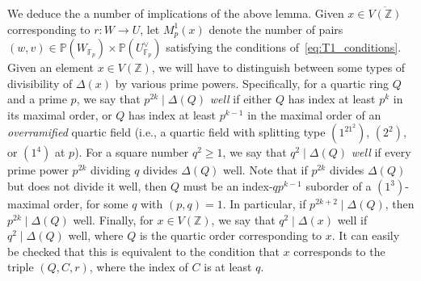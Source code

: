 \documentclass{article}
\def\Z{{\mathbb Z}}
\def\P{{\mathbb P}}
\def\F{{\mathbb F}}
\def\Z{{\mathbb Z}}
\def\P{{\mathbb P}}
\def\F{{\mathbb F}}
\def\ol{\overline}
\begin{document}
We deduce the a number of implications of the above lemma. Given $x\in \ol{V(\Z)}$ corresponding to $r:W\to U$, let $M_p^1(x)$ denote the number of pairs $(w,v)\in \P(W_{\F_p})\times\P(U^\vee_{\F_p})$ satisfying the conditions of~\eqref{eq:T1_conditions}. Given an element $x\in V(\Z)$, we will have to distinguish between some types of divisibility of $\Delta(x)$ by various prime powers. Specifically, for a quartic ring $Q$ and a prime $p$, we say that $p^{2k}\mid\Delta(Q)$  {\it well} if either $Q$ has index at least $p^k$ in its maximal order, or $Q$ has index at least $p^{k-1}$ in the maximal order of an {\it overramified} quartic field (i.e., a quartic field with splitting type $(1^21^2)$, $(2^2)$, or $(1^4)$ at $p$). For a square number $q^2\geq 1$, we say that $q^2\mid\Delta(Q)$ {\it well} if every prime power $p^{2k}$ dividing $q$ divides $\Delta(Q)$ well. Note that if $p^{2k}$ divides $\Delta(Q)$ but does not divide it well, then $Q$ must be an index-$qp^{k-1}$ suborder of a $(1^3)$-maximal order, for some $q$ with $(p,q)=1$. In particular, if $p^{2k+2}\mid\Delta(Q)$, then $p^{2k}\mid\Delta(Q)$ well. Finally, for $x\in V(\Z)$, we say that $q^2\mid\Delta(x)$ well if $q^2\mid\Delta(Q)$ well, where $Q$ is the quartic order corresponding to $x$. It can easily be checked that this is equivalent to the condition that $x$ corresponds to the triple $(Q,C,r)$, where the index of $C$ is at least $q$.
\end{document}
